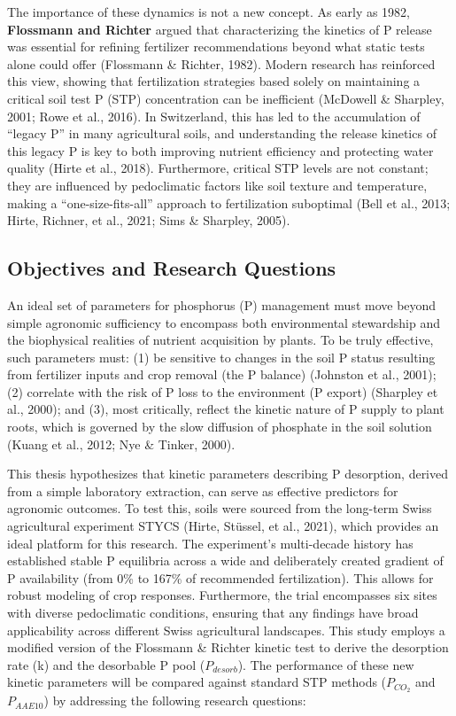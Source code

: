\documentclass[
  a4paper,
]{article}
\begin{document}
The importance of these dynamics is not a new concept. As early as 1982,
\textbf{Flossmann and Richter} argued that characterizing the kinetics
of P release was essential for refining fertilizer recommendations
beyond what static tests alone could offer (Flossmann \& Richter, 1982).
Modern research has reinforced this view, showing that fertilization
strategies based solely on maintaining a critical soil test P (STP)
concentration can be inefficient (McDowell \& Sharpley, 2001; Rowe et
al., 2016). In Switzerland, this has led to the accumulation of ``legacy
P'' in many agricultural soils, and understanding the release kinetics
of this legacy P is key to both improving nutrient efficiency and
protecting water quality (Hirte et al., 2018). Furthermore, critical STP
levels are not constant; they are influenced by pedoclimatic factors
like soil texture and temperature, making a ``one-size-fits-all''
approach to fertilization suboptimal (Bell et al., 2013; Hirte, Richner,
et al., 2021; Sims \& Sharpley, 2005).

\subsection{Objectives and Research
Questions}\label{objectives-and-research-questions}

An ideal set of parameters for phosphorus (P) management must move
beyond simple agronomic sufficiency to encompass both environmental
stewardship and the biophysical realities of nutrient acquisition by
plants. To be truly effective, such parameters must: (1) be sensitive to
changes in the soil P status resulting from fertilizer inputs and crop
removal (the P balance) (Johnston et al., 2001); (2) correlate with the
risk of P loss to the environment (P export) (Sharpley et al., 2000);
and (3), most critically, reflect the kinetic nature of P supply to
plant roots, which is governed by the slow diffusion of phosphate in the
soil solution (Kuang et al., 2012; Nye \& Tinker, 2000).

This thesis hypothesizes that kinetic parameters describing P
desorption, derived from a simple laboratory extraction, can serve as
effective predictors for agronomic outcomes. To test this, soils were
sourced from the long-term Swiss agricultural experiment STYCS (Hirte,
Stüssel, et al., 2021), which provides an ideal platform for this
research. The experiment's multi-decade history has established stable P
equilibria across a wide and deliberately created gradient of P
availability (from 0\% to 167\% of recommended fertilization). This
allows for robust modeling of crop responses. Furthermore, the trial
encompasses six sites with diverse pedoclimatic conditions, ensuring
that any findings have broad applicability across different Swiss
agricultural landscapes. This study employs a modified version of the
Flossmann \& Richter kinetic test to derive the desorption rate (k) and
the desorbable P pool (\(P_{desorb}\)). The performance of these new
kinetic parameters will be compared against standard STP methods
(\(P_{CO_2}\) and \(P_{AAE10}\)) by addressing the following research
questions:
\end{document}
